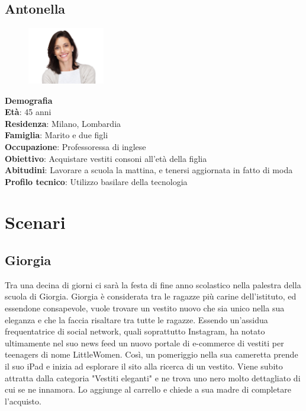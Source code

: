\documentclass[12pt,a4paper]{report}
\begin{document}
\subsection*{Antonella}
\begin{figure}
  \centering
    \includegraphics[width=0.3\textwidth]{"Images Latex/Personas/Antonella"}
\end{figure}
\textbf{Demografia}\\
\indent \textbf{Età}: 45 anni\\
\indent \textbf{Residenza}: Milano, Lombardia\\
\indent \textbf{Famiglia}: Marito e due figli\\
\indent \textbf{Occupazione}: Professoressa di inglese\\
\textbf{Obiettivo}: Acquistare vestiti consoni all'età della figlia\\
\textbf{Abitudini}: Lavorare a scuola la mattina, e tenersi aggiornata in fatto di moda\\
\textbf{Profilo tecnico}: Utilizzo basilare della tecnologia\\

\section{Scenari}
\subsection*{Giorgia}
Tra una decina di giorni ci sarà la festa di fine anno scolastico nella palestra della scuola di Giorgia. Giorgia è considerata tra le ragazze più carine dell'istituto, ed essendone consapevole, vuole trovare un vestito nuovo che sia unico nella sua eleganza e che la faccia risaltare tra tutte le ragazze. Essendo un'assidua frequentatrice di social network, quali soprattutto Instagram, ha notato ultimamente nel suo news feed un nuovo portale di e-commerce di vestiti per teenagers di nome LittleWomen. Così, un pomeriggio nella sua cameretta prende il suo iPad e inizia ad esplorare il sito alla ricerca di un vestito. Viene subito attratta dalla categoria "Vestiti eleganti" e ne trova uno nero molto dettagliato di cui se ne innamora. Lo aggiunge al carrello e chiede a sua madre di completare l'acquisto.
\end{document}
